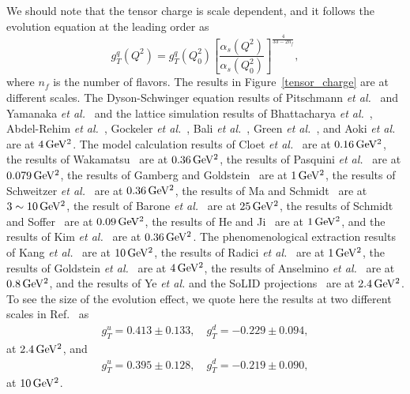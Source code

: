 \documentclass[aps,prd,twocolumn,groupedaddress,showpacs,superscriptaddress,floatfix,nofootinbib,10pt]{revtex4-1}
\begin{document}
We should note that the tensor charge is scale dependent, and it follows the evolution equation at the leading order as~\cite{Artru:1989zv}
\begin{equation}
g_T^q(Q^2)=g_T^q(Q_0^2)\left[\frac{\alpha_s(Q^2)}{\alpha_s(Q_0^2)}\right]^{\frac{4}{33-2n_f}},
\end{equation}
where $n_f$ is the number of flavors. The results in Figure~\ref{tensor_charge} are at different scales. The Dyson-Schwinger equation results of Pitschmann {\it et al.}~\cite{Pitschmann:2014jxa} and Yamanaka {\it et al.}~\cite{Yamanaka:2013zoa} and the lattice simulation results of Bhattacharya {\it et al.}~\cite{Bhattacharya:2016zcn}, Abdel-Rehim {\it et al.}~\cite{Abdel-Rehim:2015owa}, Gockeler {\it et al.}~\cite{Gockeler:2005cj}, Bali {\it et al.}~\cite{Bali:2014nma}, Green {\it et al.}~\cite{Green:2012ej}, and Aoki {\it et al.}~\cite{Aoki:2010xg} are at $4\,\rm GeV^2$. The model calculation results of Cloet {\it et al.}~\cite{Cloet:2007em} are at $0.16\,\rm GeV^2$, the results of Wakamatsu~\cite{Wakamatsu:2007nc} are at $0.36\,\rm GeV^2$, the results of Pasquini {\it et al.}~\cite{Pasquini:2005dk} are at $0.079\,\rm GeV^2$, the results of Gamberg and Goldstein~\cite{Gamberg:2001qc} are at $1\,\rm GeV^2$, the results of Schweitzer {\it et al.}~\cite{Schweitzer:2001sr} are at $0.36\,\rm GeV^2$, the results of Ma and Schmidt~\cite{Ma:1997pm} are at $3\sim10\,\rm GeV^2$, the result of Barone {\it et al.}~\cite{Barone:1996un} are at $25\,\rm GeV^2$, the results of Schmidt and Soffer~\cite{Schmidt:1997vm} are at $0.09\,\rm GeV^2$, the results of He and Ji~\cite{He:1996wy} are at $1\,\rm GeV^2$, and the results of Kim {\it et al.}~\cite{Kim:1996vk} are at $0.36\,\rm GeV^2$. The phenomenological extraction results of Kang {\it et al.}~\cite{Kang:2015msa} are at $10\,\rm GeV^2$, the results of Radici {\it et al.}~\cite{Radici:2015mwa} are at $1\,\rm GeV^2$, the results of Goldstein {\it et al.}~\cite{Goldstein:2014aja} are at $4\,\rm GeV^2$, the results of Anselmino {\it et al.}~\cite{Anselmino:2013vqa} are at $0.8\,\rm GeV^2$, and the results of Ye {\it et al.} and the SoLID projections~\cite{Ye:2016prn} are at $2.4\,\rm GeV^2$. To see the size of the evolution effect, we quote here the results at two different scales in Ref.~\cite{Ye:2016prn} as 
\begin{align}
g_T^u=0.413\pm0.133,\quad g_T^d=-0.229\pm0.094,
\end{align}
at $2.4\,\rm GeV^2$, and
\begin{align}
g_T^u=0.395\pm0.128,\quad g_T^d=-0.219\pm0.090,
\end{align}
at $10\,\rm GeV^2$.
\end{document}
